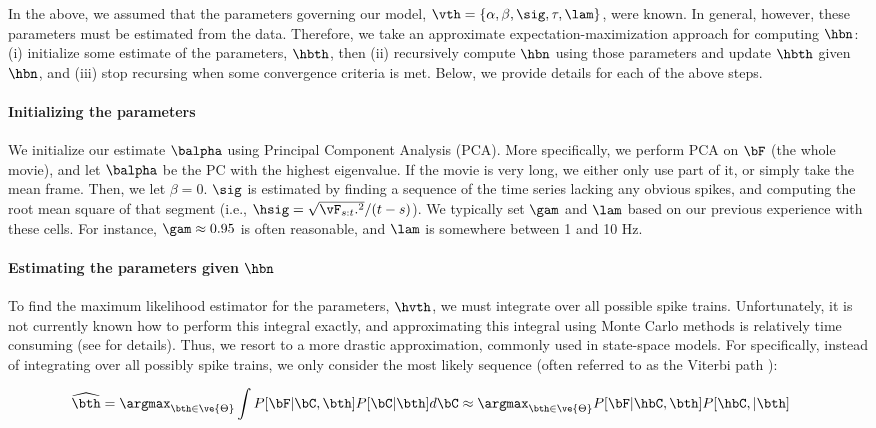 In the above, we assumed that the parameters governing our model, $\vth=\{\alpha, \beta, \sig, \tau, \lam\}$, were known. In general, however, these parameters must be estimated from the data. Therefore, we take an approximate expectation-maximization approach for computing $\hbn$: (i) initialize some estimate of the parameters, $\hbth$, then (ii) recursively compute $\hbn$ using those parameters and update $\hbth$ given $\hbn$, and (iii) stop recursing when some convergence criteria is met.  Below, we provide details for each of the above steps.

\paragraph{Initializing the parameters}

We initialize our estimate $\balpha$ using Principal Component Analysis (PCA). More specifically, we perform PCA on $\bF$ (the whole movie), and let $\balpha$ be the PC with the highest eigenvalue.  If the movie is very long, we either only use part of it, or simply take the mean frame.  Then, we let $\beta=0$.  $\sig$ is estimated by finding a sequence of the time series lacking any obvious spikes, and computing the root mean square of that segment (i.e., $\hsig=\sqrt{\vF_{s:t}.^2}/(t-s)$).  We typically set $\gam$ and $\lam$ based on our previous experience with these cells.  For instance, $\gam \approx 0.95$ is often reasonable, and $\lam$ is somewhere between 1 and 10 Hz.  

\paragraph{Estimating the parameters given $\hbn$}

To find the maximum likelihood estimator for the parameters, $\hvth$, we must integrate over all possible spike trains. Unfortunately, it is not currently known how to perform this integral exactly, and approximating this integral using Monte Carlo methods is relatively time consuming (see \cite{VogelsteinPaninski09} for details).  Thus, we resort to a more drastic approximation, commonly used in state-space models.  For specifically, instead of integrating over all possibly spike trains, we only consider the most likely sequence (often referred to as the Viterbi path \cite{Rabiner89}): 

\begin{align} \label{eq:par1}
\widehat{\bth} &= \argmax_{\bth \in \ve{\Theta}} \int P[\bF|\bC, \bth] P[\bC | \bth]  d\bC  \approx \argmax_{\bth \in \ve{\Theta}}P[\bF| \hbC, \bth] P[\hbC, | \bth]
\end{align}

